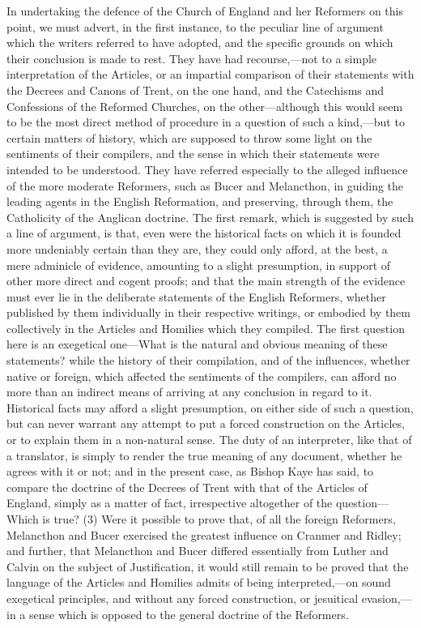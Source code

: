 \documentclass[
]{book}
\begin{document}
In undertaking the defence of the Church of England and her Reformers on this point, we must advert, in the first instance, to the peculiar line of argument which the writers referred to have adopted, and the specific grounds on which their conclusion is made to rest. They have had recourse,---not to a simple interpretation of the Articles, or an impartial comparison of their statements with the Decrees and Canons of Trent, on the one hand, and the Catechisms and Confessions of the Reformed Churches, on the other---although this would seem to be the most direct method of procedure in a question of such a kind,---but to certain matters of history, which are supposed to throw some light on the sentiments of their compilers, and the sense in which their statements were intended to be understood. They have referred especially to the alleged influence of the more moderate Reformers, such as Bucer and Melancthon, in guiding the leading agents in the English Reformation, and preserving, through them, the Catholicity of the Anglican doctrine. The first remark, which is suggested by such a line of argument, is that, even were the historical facts on which it is founded more undeniably certain than they are, they could only afford, at the best, a mere adminicle of evidence, amounting to a slight presumption, in support of other more direct and cogent proofs; and that the main strength of the evidence must ever lie in the deliberate statements of the English Reformers, whether published by them individually in their respective writings, or embodied by them collectively in the Articles and Homilies which they compiled. The first question here is an exegetical one---What is the natural and obvious meaning of these statements? while the history of their compilation, and of the influences, whether native or foreign, which affected the sentiments of the compilers, can afford no more than an indirect means of arriving at any conclusion in regard to it. Historical facts may afford a slight presumption, on either side of such a question, but can never warrant any attempt to put a forced construction on the Articles, or to explain them in a non-natural sense. The duty of an interpreter, like that of a translator, is simply to render the true meaning of any document, whether he agrees with it or not; and in the present case, as Bishop Kaye has said, to compare the doctrine of the Decrees of Trent with that of the Articles of England, simply as a matter of fact, irrespective altogether of the question---Which is true? (3) Were it possible to prove that, of all the foreign Reformers, Melancthon and Bucer exercised the greatest influence on Cranmer and Ridley; and further, that Melancthon and Bucer differed essentially from Luther and Calvin on the subject of Justification, it would still remain to be proved that the language of the Articles and Homilies admits of being interpreted,---on sound exegetical principles, and without any forced construction, or jesuitical evasion,---in a sense which is opposed to the general doctrine of the Reformers.
\end{document}
